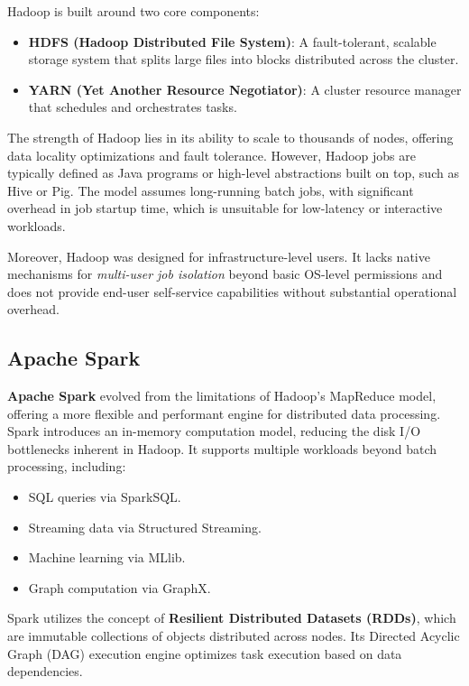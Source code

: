 Hadoop is built around two core components:
\begin{itemize}
    \item \textbf{HDFS (Hadoop Distributed File System)}: A fault-tolerant, scalable storage system that splits large files into blocks distributed across the cluster.
    \item \textbf{YARN (Yet Another Resource Negotiator)}: A cluster resource manager that schedules and orchestrates tasks.
\end{itemize}

The strength of Hadoop lies in its ability to scale to thousands of nodes, offering data locality optimizations and fault tolerance. However, Hadoop jobs are 
typically defined as Java programs or high-level abstractions built on top, such as Hive or Pig. The model assumes long-running batch jobs, with significant 
overhead in job startup time, which is unsuitable for low-latency or interactive workloads.

Moreover, Hadoop was designed for infrastructure-level users. It lacks native mechanisms for \textit{multi-user job isolation} beyond basic OS-level 
permissions and does not provide end-user self-service capabilities without substantial operational overhead.

\subsection{Apache Spark}

\textbf{Apache Spark} evolved from the limitations of Hadoop’s MapReduce model, offering a more flexible and performant engine for distributed data processing. 
Spark introduces an in-memory computation model, reducing the disk I/O bottlenecks inherent in Hadoop. It supports multiple workloads beyond batch processing, including:
\begin{itemize}
    \item SQL queries via SparkSQL.
    \item Streaming data via Structured Streaming.
    \item Machine learning via MLlib.
    \item Graph computation via GraphX.
\end{itemize}

Spark utilizes the concept of \textbf{Resilient Distributed Datasets (RDDs)}, which are immutable collections of objects distributed across nodes. 
Its Directed Acyclic Graph (DAG) execution engine optimizes task execution based on data dependencies.

